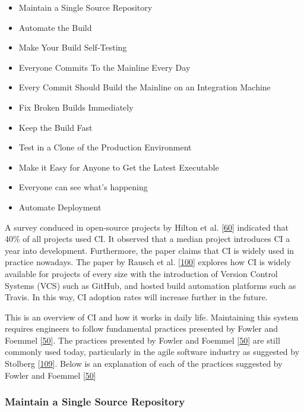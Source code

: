\documentclass[]{book}
\providecommand{\tightlist}{%
  \setlength{\itemsep}{0pt}\setlength{\parskip}{0pt}}
\begin{document}
\begin{itemize}
\tightlist
\item
  Maintain a Single Source Repository
\item
  Automate the Build
\item
  Make Your Build Self-Testing
\item
  Everyone Commits To the Mainline Every Day
\item
  Every Commit Should Build the Mainline on an Integration Machine
\item
  Fix Broken Builds Immediately
\item
  Keep the Build Fast
\item
  Test in a Clone of the Production Environment
\item
  Make it Easy for Anyone to Get the Latest Executable
\item
  Everyone can see what's happening
\item
  Automate Deployment
\end{itemize}

A survey conduced in open-source projects by Hilton et al.
{[}\protect\hyperlink{ref-hilton2016usage}{60}{]} indicated that 40\% of
all projects used CI. It observed that a median project introduces CI a
year into development. Furthermore, the paper claims that CI is widely
used in practice nowadays. The paper by Rausch et al.
{[}\protect\hyperlink{ref-rausch2017empirical}{100}{]} explores how CI
is widely available for projects of every size with the introduction of
Version Control Systems (VCS) such as GitHub, and hosted build
automation platforms such as Travis. In this way, CI adoption rates will
increase further in the future.

This is an overview of CI and how it works in daily life. Maintaining
this system requires engineers to follow fundamental practices presented
by Fowler and Foemmel
{[}\protect\hyperlink{ref-fowler2006continuous}{50}{]}. The practices
presented by Fowler and Foemmel
{[}\protect\hyperlink{ref-fowler2006continuous}{50}{]} are still
commonly used today, particularly in the agile software industry as
suggested by Stolberg
{[}\protect\hyperlink{ref-stolberg2009enabling}{109}{]}. Below is an
explanation of each of the practices suggested by Fowler and Foemmel
{[}\protect\hyperlink{ref-fowler2006continuous}{50}{]}

\subsubsection{Maintain a Single Source
Repository}\label{maintain-a-single-source-repository}
\end{document}
